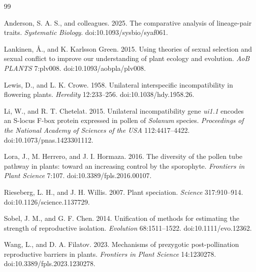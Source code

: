 \documentclass[12pt]{article}
\begin{document}
\begin{thebibliography}{99}

Anderson, S. A. S., and colleagues. 2025. The comparative analysis of lineage-pair traits. \emph{Systematic Biology}. doi:10.1093/sysbio/syaf061.

Lankinen, {\AA}., and K. Karlsson Green. 2015. Using theories of sexual selection and sexual conflict to improve our understanding of plant ecology and evolution. \emph{AoB PLANTS} 7:plv008. doi:10.1093/aobpla/plv008.

Lewis, D., and L. K. Crowe. 1958. Unilateral interspecific incompatibility in flowering plants. \emph{Heredity} 12:233--256. doi:10.1038/hdy.1958.26.

Li, W., and R. T. Chetelat. 2015. Unilateral incompatibility gene \emph{ui1.1} encodes an S-locus F-box protein expressed in pollen of \emph{Solanum} species. \emph{Proceedings of the National Academy of Sciences of the USA} 112:4417--4422. doi:10.1073/pnas.1423301112.

Lora, J., M. Herrero, and J. I. Hormaza. 2016. The diversity of the pollen tube pathway in plants: toward an increasing control by the sporophyte. \emph{Frontiers in Plant Science} 7:107. doi:10.3389/fpls.2016.00107.

Rieseberg, L. H., and J. H. Willis. 2007. Plant speciation. \emph{Science} 317:910--914. doi:10.1126/science.1137729.

Sobel, J. M., and G. F. Chen. 2014. Unification of methods for estimating the strength of reproductive isolation. \emph{Evolution} 68:1511--1522. doi:10.1111/evo.12362.

Wang, L., and D. A. Filatov. 2023. Mechanisms of prezygotic post-pollination reproductive barriers in plants. \emph{Frontiers in Plant Science} 14:1230278. doi:10.3389/fpls.2023.1230278.

\end{thebibliography}
\end{document}
